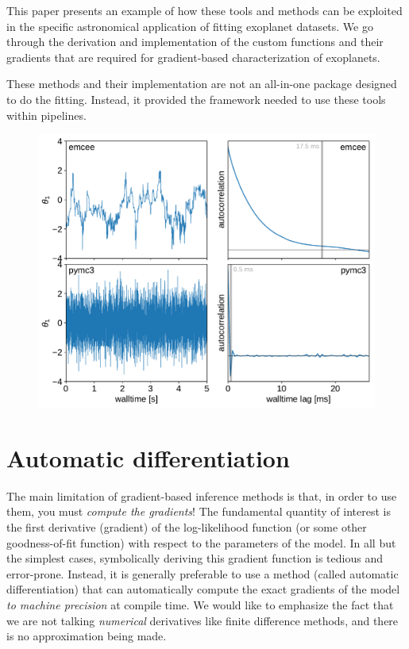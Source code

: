 \documentclass[modern]{aastex62}
\begin{document}
This paper presents an example of how these tools and methods can be
exploited in the specific astronomical application of fitting exoplanet
datasets.
We go through the derivation and implementation of the custom functions and
their gradients that are required for gradient-based characterization of
exoplanets.

These methods and their implementation are not an all-in-one package designed
to do the fitting.
Instead, it provided the framework needed to use these tools within pipelines.

\begin{figure}[htbp]
\begin{centering}
\includegraphics[width=0.8\linewidth]{figures/gaussians.pdf}
\end{centering}
\end{figure}

\section{Automatic differentiation}

The main limitation of gradient-based inference methods is that, in order to
use them, you must \emph{compute the gradients}!
The fundamental quantity of interest is the first derivative (gradient) of the
log-likelihood function (or some other goodness-of-fit function) with respect
to the parameters of the model.
In all but the simplest cases, symbolically deriving this gradient function is
tedious and error-prone.
Instead, it is generally preferable to use a method (called automatic
differentiation) that can automatically compute the exact gradients of the
model \emph{to machine precision} at compile time.
We would like to emphasize the fact that we are not talking \emph{numerical}
derivatives like finite difference methods, and there is no approximation
being made.
\end{document}
